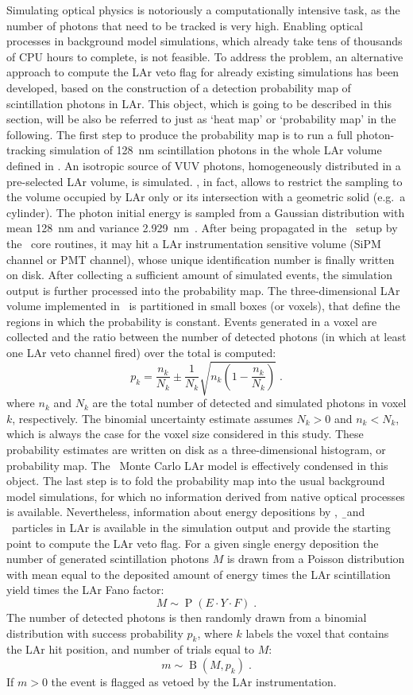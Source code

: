 Simulating optical physics is notoriously a computationally intensive task, as the number
of photons that need to be tracked is very high. Enabling optical processes in background
model simulations, which already take tens of thousands of CPU hours to complete, is not
feasible. To address the problem, an alternative approach to compute the LAr veto flag for
already existing simulations has been developed, based on the construction of a detection
probability map of scintillation photons in LAr. This object, which is going to be
described in this section, will be also be referred to just as `heat map' or
`probability map' in the following.
\newpar
The first step to produce the probability map is to run a full photon-tracking simulation
of 128~nm scintillation photons in the whole LAr volume defined in \mage. An isotropic
source of VUV photons, homogeneously distributed in a pre-selected LAr volume, is
simulated.  \mage, in fact, allows to restrict the sampling to the volume occupied by LAr
only or its intersection with a geometric solid (e.g.~a cylinder). The photon initial
energy is sampled from a Gaussian distribution with mean 128~nm and variance
2.929~nm~\cite{Heindl2010}. After being propagated in the \gerda\ setup by the \geant\
core routines, it may hit a LAr instrumentation sensitive volume (SiPM channel or PMT
channel), whose unique identification number is finally written on disk. After collecting
a sufficient amount of simulated events, the simulation output is further processed into
the probability map. The three-dimensional LAr volume implemented in \mage\ is partitioned
in small boxes (or voxels), that define the regions in which the probability is constant.
Events generated in a voxel are collected and the ratio between the number of detected
photons (in which at least one LAr veto channel fired) over the total is computed:
\[
  p_k = \frac{n_k}{N_k} \pm \frac{1}{N_k}\sqrt{n_k \left(1 - \frac{n_k}{N_k} \right)} \;.
\]
where $n_k$ and $N_k$ are the total number of detected and simulated photons in voxel $k$,
respectively. The binomial uncertainty estimate assumes $N_k>0$ and $n_k<N_k$, which is
always the case for the voxel size considered in this study.  These probability estimates
are written on disk as a three-dimensional histogram, or probability map. The \gerda\
Monte Carlo LAr model is effectively condensed in this object.
\newpar
The last step is to fold the probability map into the usual background model simulations,
for which no information derived from native optical processes is available. Nevertheless,
information about energy depositions by \g, \b\ and \a\ particles in LAr is available in
the simulation output and provide the starting point to compute the LAr veto flag. For a
given single energy deposition the number of generated scintillation photons $M$ is drawn
from a Poisson distribution with mean equal to the deposited amount of energy times the
LAr scintillation yield times the LAr Fano factor:
\[
  M \sim \operatorname{P}(E \cdot Y \cdot F) \;.
\]
The number of detected photons is then randomly drawn from a binomial distribution with
success probability $p_k$, where $k$ labels the voxel that contains the LAr hit position,
and number of trials equal to $M$:
\[
  m \sim \operatorname{B}(M, p_k) \;.
\]
If $m>0$ the event is flagged as vetoed by the LAr instrumentation.

